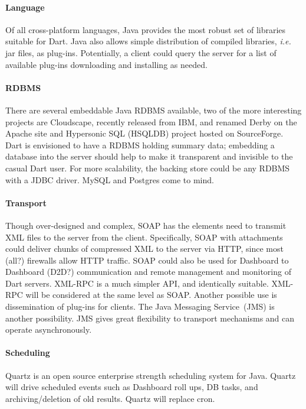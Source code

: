 \documentclass{InsightBook}
\begin{document}
\paragraph{Language}
Of all cross-platform languages, Java provides the most robust set of libraries suitable for
Dart.  Java also allows simple distribution of compiled libraries,
\emph{i.e.} jar files, as plug-ins.  Potentially, a client could query
the server for a list of available plug-ins downloading and installing
as needed.

\paragraph{RDBMS}
There are several embeddable Java RDBMS available,
two of the more interesting projects are Cloudscape, recently released
from IBM, and renamed Derby on the Apache site and Hypersonic SQL
(HSQLDB) project hosted on SourceForge.  Dart is envisioned to have a
RDBMS holding summary data; embedding a database into the server
should help to make it transparent and invisible to the casual Dart
user.  For more scalability, the backing store could be any
RDBMS with a JDBC driver.  MySQL and Postgres come to mind.

\paragraph{Transport} 
Though over-designed and complex, SOAP has the elements need to
transmit XML files to the server from the client.  Specifically, SOAP
with attachments could deliver chunks of compressed XML to the server
via HTTP, since most (all?) firewalls allow HTTP traffic. SOAP could
also be used for Dashboard to Dashboard (D2D?)  communication and
remote management and monitoring of Dart servers.  XML-RPC is a much
simpler API, and identically suitable.  XML-RPC will be considered at
the same level as SOAP. Another possible use is dissemination of
plug-ins for clients.  The Java Messaging Service~(JMS) is another
possibility.  JMS gives great flexibility to transport mechanisms and
can operate asynchronously.

\paragraph{Scheduling}
Quartz is an open source enterprise strength
scheduling system for Java.  Quartz will drive scheduled events such
as Dashboard roll ups, DB tasks, and archiving/deletion of old
results.  Quartz will replace cron.
\end{document}
